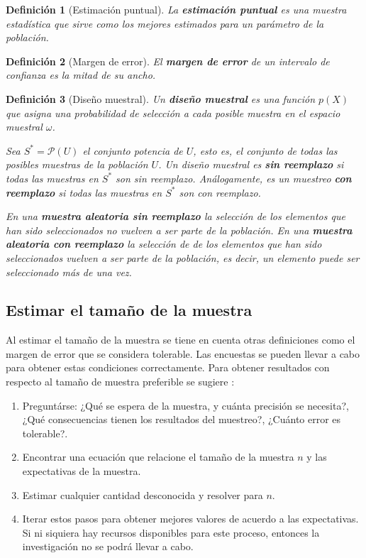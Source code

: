 \documentclass{report}
\newtheorem{definition}{Definición}
\begin{document}
\begin{definition}[Estimación puntual]
    La \textbf{estimación puntual} es una muestra estadística que sirve como los mejores estimados para un parámetro de la población.
\end{definition}

\begin{definition}[Margen de error]
    El \textbf{margen de error} de un intervalo de confianza es la mitad de su ancho.
\end{definition}

\begin{definition}[Diseño muestral]
    Un \textbf{diseño muestral} es una función $p(X)$ que asigna una probabilidad de selección a cada posible muestra en el espacio muestral $\omega$.
    
    \bigbreak
    
    Sea $S^* = \mathcal{P}(U)$ el conjunto potencia de $U$, esto es, el conjunto de todas las posibles muestras de la población $U$. Un diseño muestral es \textbf{sin reemplazo} si todas las muestras en $S^*$ son sin reemplazo. Análogamente, es un muestreo \textbf{con reemplazo} si todas las muestras en $S^*$ son con reemplazo.

    \bigbreak
    
    En una \textbf{muestra aleatoria sin reemplazo} la selección de los elementos que han sido seleccionados no vuelven a ser parte de la población. En una \textbf{muestra aleatoria con reemplazo} la selección de de los elementos que han sido seleccionados vuelven a ser parte de la población, es decir, un elemento puede ser seleccionado más de una vez.
\end{definition}

\subsection{Estimar el tamaño de la muestra}

Al estimar el tamaño de la muestra se tiene en cuenta otras definiciones como el margen de error que se considera tolerable. Las encuestas se pueden llevar a cabo para obtener estas condiciones correctamente. Para obtener resultados con respecto al tamaño de muestra preferible se sugiere \cite{lohr-2009}:

\begin{enumerate}
    \item Preguntárse: ¿Qué se espera de la muestra, y cuánta precisión se necesita?, ¿Qué consecuencias tienen los resultados del muestreo?, ¿Cuánto error es tolerable?.
    
    \item Encontrar una ecuación que relacione el tamaño de la muestra $n$ y las expectativas de la muestra.
    
    \item Estimar cualquier cantidad desconocida y resolver para $n$.
    
    \item Iterar estos pasos para obtener mejores valores de acuerdo a las expectativas. Si ni siquiera hay recursos disponibles para este proceso, entonces la investigación no se podrá llevar a cabo.
\end{enumerate}
\end{document}
